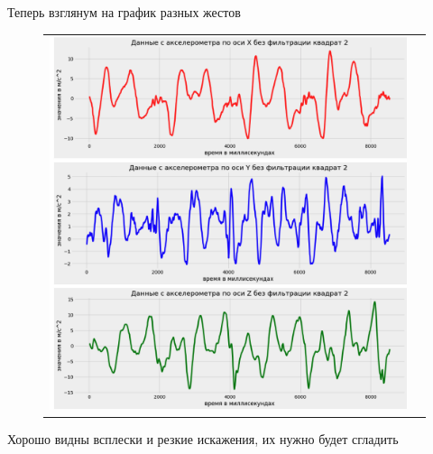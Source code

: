 \newpage
Теперь взглянум на график разных жестов 
\begin{figure}[H]
    \begin{center}
        \begin{tabular}{cc}
            \includegraphics[width=1\textwidth]{farim/sq} & 
        \end{tabular}
    \end{center}
\end{figure}

Хорошо видны всплески и  резкие искажения, их нужно будет сгладить


